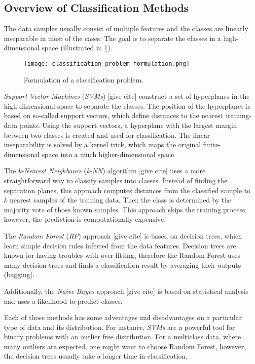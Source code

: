 \subsection*{Overview of Classification Methods} \label{ssec:other_classification_methods}
The data samples usually consist of multiple features and the classes are linearly inseparable in most of the cases. The goal is to separate the classes in a high-dimensional space (illustrated in \cref{img:classification_problem_formulation}).

\begin{figure}[H]
  \centering
  \texttt{[image: classification\_problem\_formulation.png]}
  \caption{Formulation of a classification problem.}
  \label{img:classification_problem_formulation}
\end{figure}

\textit{Support Vector Machines} (\textit{SVMs}) [give cite] construct a set of hyperplanes in the high dimensional space to separate the classes. The position of the hyperplanes is based on so-called support vectors, which define distances to the nearest training-data points. Using the support vectors, a hyperplane with the largest margin between two classes is created and used for classification. The linear inseparability is solved by a kernel trick, which maps the original finite-dimensional space into a much higher-dimensional space.

The \textit{k-Nearest Neighbours} (\textit{k-NN}) algorithm [give cite] uses a more straightforward way to classify samples into classes. Instead of finding the separation planes, this approach computes distances from the classified sample to $ k $ nearest samples of the training data. Then the class is determined by the majority vote of those known samples. This approach skips the training process, however, the prediction is computationally expensive.

The \textit{Random Forest} (\textit{RF}) approach [give cite] is based on decision trees, which learn simple decision rules inferred from the data features. Decision trees are known for having troubles with over-fitting, therefore the Random Forest uses many decision trees and finds a classification result by averaging their outputs (bagging).

Additionally, the \textit{Naive Bayes} approach [give cite] is based on statistical analysis and uses a likelihood to predict classes. 

Each of those methods has some adventages and disadvantages on a particular type of data and its distribution. For instance, \textit{SVMs} are a powerful tool for binary problems with an outlier free distribution. For a multiclass data, where many outliers are expected, one might want to choose Random Forest, however, the decision trees usually take a longer time in classification.

